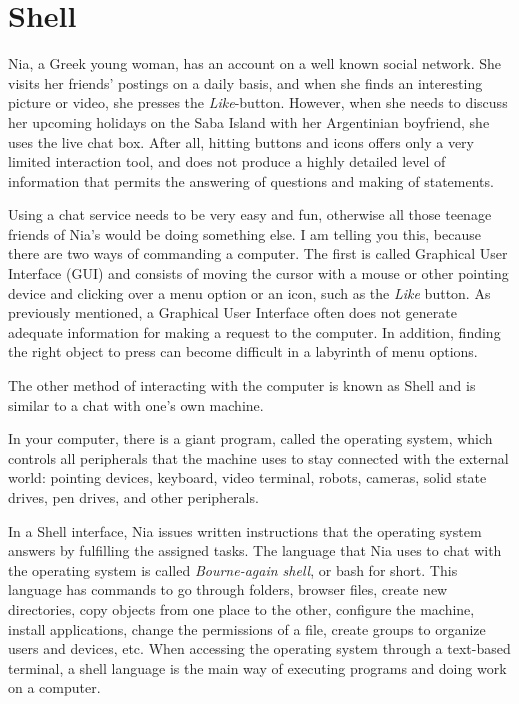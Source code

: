 \documentclass[a4paper,12pt]{book}
\begin{document}
\chapter{Shell}
Nia, a Greek young woman, has an
account on a well known social network.
She visits her friends' postings on a daily basis,
and when she finds an interesting picture or video,
she presses the {\em Like}-button. However, when
she needs to discuss her upcoming holidays on the Saba Island
with her Argentinian boyfriend, she uses the
live chat box. After all, hitting buttons and
icons offers only a very limited interaction tool,
and does not produce a highly detailed
level of information that permits the answering
of questions and making of statements.


Using a chat service needs to
be very easy and fun, otherwise all those teenage
friends of Nia's would be doing something else.
I am telling you this, because there are
two ways of commanding a computer.
The first is called Graphical User Interface (GUI)
and consists of moving the cursor with a
mouse or other pointing device and clicking
over a menu option or an icon,
such as the {\em Like} button.
As previously mentioned, a Graphical User Interface
often does not generate adequate information
for making a request to the computer. In addition,
finding the right object  to press
can become difficult in a labyrinth of
menu options.

The other method of interacting with
the computer is known as Shell and is similar to
a chat with one's own machine.

In your computer, there is a giant
program, called the operating system, which controls
all peripherals that the machine uses to
stay connected with the external world:
pointing devices,  keyboard,
video terminal, robots, cameras, solid
state drives, pen drives, and other peripherals.

In a Shell interface, Nia issues written instructions
that the operating system answers by fulfilling the
assigned tasks. The language that Nia
uses to chat with the operating
system is called {\em Bourne-again shell}, or
bash for short. This language has
commands to go through folders, browser
files, create new directories, copy
objects from one place to the other,
configure the machine, install
applications, change the permissions
of a file, create groups to organize
users and devices, etc.
When accessing the operating system through
a text-based terminal, a shell language is the main way
of executing programs and doing work on a computer.
\end{document}
